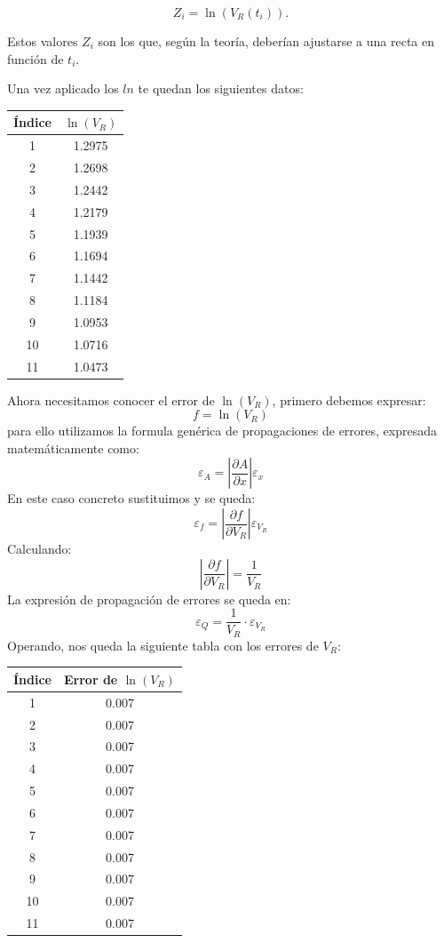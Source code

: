\documentclass{article}
\begin{document}
\[
Z_i = \ln(V_R(t_i)).
\]

Estos valores \( Z_i \) son los que, según la teoría, deberían ajustarse a una recta en función de \( t_i \).

\vspace{1.5em}

Una vez aplicado los $ln$ te quedan los siguientes datos:

\begin{center}
\begin{table}[H]
	\centering
	\begin{tabular}{|c|c|}
		\hline
		\textbf{Índice} & \textbf{$\ln(V_R)$} \\
		\hline
		1  & 1.2975 \\
		2  & 1.2698 \\
		3  & 1.2442 \\
		4  & 1.2179 \\
		5  & 1.1939 \\
		6  & 1.1694 \\
		7  & 1.1442 \\
		8  & 1.1184 \\
		9  & 1.0953 \\
		10 & 1.0716 \\
		11 & 1.0473 \\
		\hline
	\end{tabular}
\end{table}
\end{center}

\vspace{2em}
Ahora necesitamos conocer el error de $\ln(V_R)$, primero debemos expresar:
\[
f = \ln(V_R)
\] para ello utilizamos la formula genérica de propagaciones de errores, expresada matemáticamente como:
\[
\varepsilon_A = \left| \frac{\partial A}{\partial x} \right| \varepsilon_x
\]
En este caso concreto sustituimos y se queda:
\[
\varepsilon_f = \left| \frac{\partial f}{\partial V_R} \right| \varepsilon_{V_R}
\]
Calculando:
\[
\left| \frac{\partial f}{\partial V_R} \right| = \frac{1}{V_R}
\] 
La expresión de propagación de errores se queda en:
\[
\varepsilon_Q = \frac{1}{V_R} \cdot \varepsilon_{V_R}
\]
Operando, nos queda la siguiente tabla con los errores de $V_R$:
\begin{table}[H]
	\centering
	\begin{tabular}{|c|c|}
		\hline
		\textbf{Índice} & \textbf{Error de $\ln(V_R)$} \\
		\hline
		1  & 0.007 \\
		2  & 0.007 \\
		3  & 0.007 \\
		4  & 0.007 \\
		5  & 0.007 \\
		6  & 0.007 \\
		7  & 0.007 \\
		8  & 0.007 \\
		9  & 0.007 \\
		10 & 0.007 \\
		11 & 0.007 \\
		\hline
	\end{tabular}
\end{table}
\end{document}
